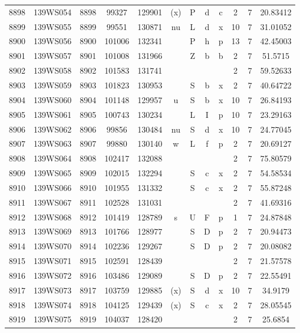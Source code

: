\begin{tabular}{|*{12}{c|}}
8898 & 139WS054 & 8898 & 99327 & 129901 & (x) & P & d & c & 2 & 7 & 20.83412 \\ 
8899 & 139WS055 & 8899 & 99551 & 130871 & nu & L & d & x & 10 & 7 & 31.01052 \\ 
8900 & 139WS056 & 8900 & 101006 & 132341 &  & P & h & p & 13 & 7 & 42.45003 \\ 
8901 & 139WS057 & 8901 & 101008 & 131966 &  & Z & b & b & 2 & 7 & 51.5715 \\ 
8902 & 139WS058 & 8902 & 101583 & 131741 &  &  &  &  & 2 & 7 & 59.52633 \\ 
8903 & 139WS059 & 8903 & 101823 & 130953 &  & S & b & x & 2 & 7 & 40.64722 \\ 
8904 & 139WS060 & 8904 & 101148 & 129957 & u & S & b & x & 10 & 7 & 26.84193 \\ 
8905 & 139WS061 & 8905 & 100743 & 130234 &  & L & I & p & 10 & 7 & 23.29163 \\ 
8906 & 139WS062 & 8906 & 99856 & 130484 & nu & S & d & x & 10 & 7 & 24.77045 \\ 
8907 & 139WS063 & 8907 & 99880 & 130140 & w & L & f & p & 2 & 7 & 20.69127 \\ 
8908 & 139WS064 & 8908 & 102417 & 132088 &  &  &  &  & 2 & 7 & 75.80579 \\ 
8909 & 139WS065 & 8909 & 102015 & 132294 &  & S & c & x & 2 & 7 & 54.58534 \\ 
8910 & 139WS066 & 8910 & 101955 & 131332 &  & S & c & x & 2 & 7 & 55.87248 \\ 
8911 & 139WS067 & 8911 & 102528 & 131031 &  &  &  &  & 2 & 7 & 41.69316 \\ 
8912 & 139WS068 & 8912 & 101419 & 128789 & s & U & F & p & 1 & 7 & 24.87848 \\ 
8913 & 139WS069 & 8913 & 101766 & 128977 &  & S & D & p & 2 & 7 & 20.94473 \\ 
8914 & 139WS070 & 8914 & 102236 & 129267 &  & S & D & p & 2 & 7 & 20.08082 \\ 
8915 & 139WS071 & 8915 & 102591 & 128439 &  &  &  &  & 2 & 7 & 21.57578 \\ 
8916 & 139WS072 & 8916 & 103486 & 129089 &  & S & D & p & 2 & 7 & 22.55491 \\ 
8917 & 139WS073 & 8917 & 103759 & 129885 & (x) & S & d & x & 10 & 7 & 34.9179 \\ 
8918 & 139WS074 & 8918 & 104125 & 129439 & (x) & S & c & x & 2 & 7 & 28.05545 \\ 
8919 & 139WS075 & 8919 & 104037 & 128420 &  &  &  &  & 2 & 7 & 25.6854 \\ 

\end{tabular}

